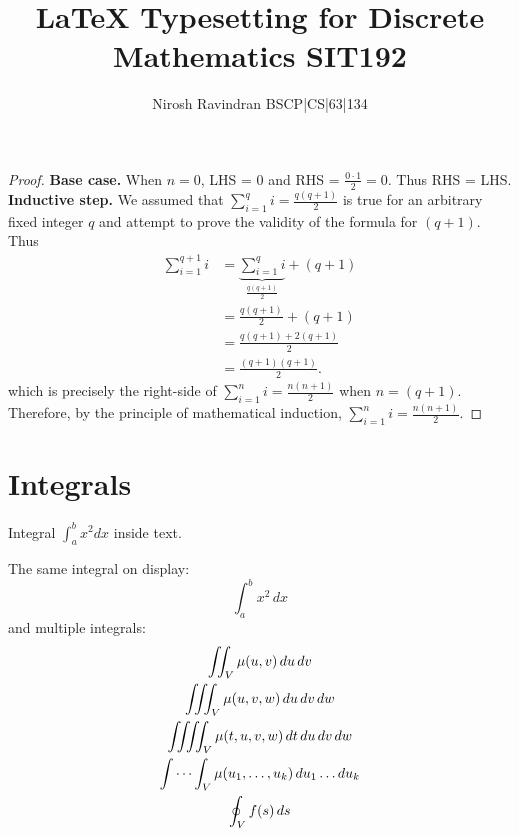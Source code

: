 \documentclass[addpoints,answers,12pt]{exam} %
\title{LaTeX Typesetting for Discrete Mathematics SIT192}
\author{Nirosh Ravindran BSCP|CS|63|134}
\begin{document}
	\maketitle
	\begin{questions}
		
		\begin{solution}
			\begin{proof}\hfil
				
				\textbf{Base case.} When $  n = 0 $, LHS = $ 0 $ and RHS = $ \frac{0\cdot 1}{2} = 0$. Thus RHS = LHS.
				\textbf{Inductive step.} We assumed that $ \sum_{i=1}^{q} i = \frac{q(q+1)}{2} $ is true for an arbitrary fixed integer $ q $ and attempt to prove the validity of the formula for $ (q+1) $. Thus 
				\begin{align*}
					\sum_{i=1}^{q+1} i &=  \underbrace{\sum_{i=1}^{q} i}_{\frac{q(q+1)}{2}} + (q+1) \\
					&= \frac{q(q+1)}{2} + (q+1) \\
					&= \frac{q(q+1) + 2(q+1)}{2} \\
					&= \frac{(q+1)(q+1)}{2} \mbox{.}
				\end{align*} 
				which is precisely the right-side of $ \sum_{i=1}^{n} i = \frac{n(n+1)}{2} $ when $ n = (q+1) $.
				Therefore, by the principle of mathematical induction, $ \sum_{i=1}^{n} i = \frac{n(n+1)}{2} $.
			\end{proof}
		\end{solution}
		\cite{stylianides2007preservice}
	    \vspace{8cm}
	    
	    
	    
	    
		\section{Integrals}
		
		Integral \(\int_{a}^{b} x^2 dx\) inside text.
		
		\medskip
		
		The same integral on display:
		\[
		\int_{a}^{b} x^2 \,dx
		\]
		and multiple integrals:
		\begin{gather*}
			\iint_V \mu(u,v) \,du\,dv
			\\
			\iiint_V \mu(u,v,w) \,du\,dv\,dw
			\\
			\iiiint_V \mu(t,u,v,w) \,dt\,du\,dv\,dw
			\\
			\idotsint_V \mu(u_1,\dots,u_k) \,du_1 \dots du_k
			\\
			\oint_V f(s) \,ds
		\end{gather*}
		\cite{lifanov1996singular}
		

\end{questions}
\end{document}
